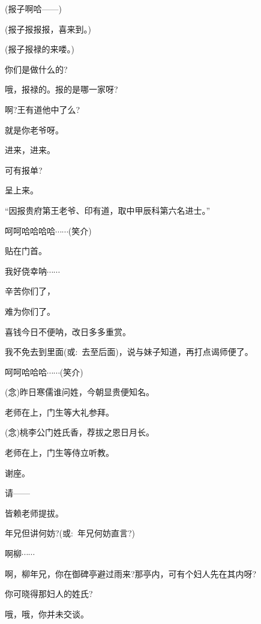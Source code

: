 {{(报子\hspace{30pt}啊哈------)}

{(报子\hspace{30pt}报报报，喜来到。)}

{(报子\hspace{30pt}报禄的来喽。)}

{你们是做什么的?}

{哦，报禄的。报的是哪一家呀?}

{啊?王有道他中了么?}

{就是你老爷呀。}

{进来，进来。}

{可有报单?}

{呈上来。}

{``因报贵府第王老爷、印有道，取中甲辰科第六名进士。''}

{呵呵哈哈哈哈$\cdots{}\cdots{}$({\hwfs 笑介})}

{贴在门首。}

{我好侥幸{\footnotesize 呐}$\cdots{}\cdots{}$}

{辛苦你们了，}

{难为你们了。}

{喜钱今日不便呐，改日多多重赏。}

{我不免去到里面({\akai 或}:~去至后面)，说与妹子知道，再打点谒师便了。}


{呵呵哈哈哈$\cdots{}\cdots{}$({\hwfs 笑介})}

{\vspace{5pt}}

{({\akai 念})昨日寒儒谁问姓，今朝显贵便知名。}

{老师在上，门生等大礼参拜。}

{({\akai 念})桃李公门姓氏香，荐拔之恩日月长。}

{老师在上，门生等侍立听教。}

{谢座。}

{请------}

{皆赖老师提拔。}

{年兄但讲何妨?({\akai 或}:~年兄何妨直言?)}

{啊柳$\cdots{}\cdots{}$}

{啊，柳年兄，你在御碑亭避过雨来?那亭内，可有个妇人先在其内呀?}

{你可晓得那妇人的姓氏?}

{哦，哦，你并未交谈。}

}
